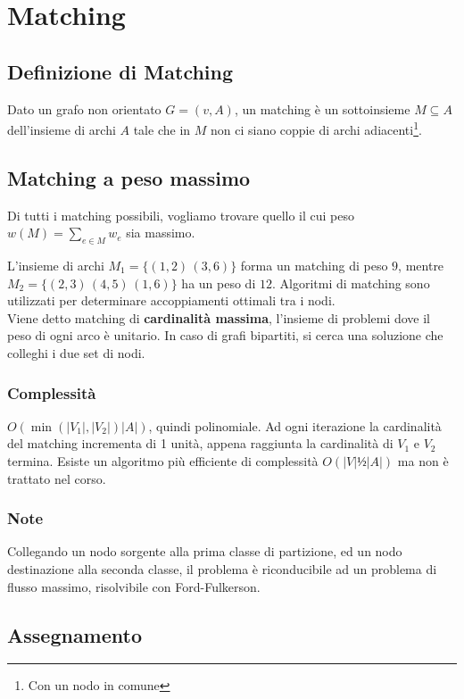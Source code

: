 \documentclass[../template]{subfiles}
\begin{document}
\section{Matching}
\subsection{Definizione di Matching}
Dato un grafo non orientato $G = (v, A)$, un matching è un sottoinsieme $M \subseteq A$ dell'insieme di archi $A$ tale che
in $M$ non ci siano coppie di archi adiacenti\footnote{Con un nodo in comune}.
\subsection{Matching a peso massimo}
Di tutti i matching possibili, vogliamo trovare quello il cui peso $w(M) = \sum_{e \in M} w_e$ sia massimo.

\begin{figure}[h]
    \centering
\end{figure}

\noindent L'insieme di archi $M_1 = \{ (1, 2) \, (3, 6)\}$ forma un matching di peso $9$, mentre $M_2 = \{(2, 3)\,(4, 5)\,(1, 6)\}$ ha un peso
di $12$.
Algoritmi di matching sono utilizzati per determinare accoppiamenti ottimali tra i nodi.
\\[10pt]
Viene detto matching di \textbf{cardinalità massima}, l'insieme di problemi dove il peso di ogni arco è unitario.
In caso di grafi bipartiti, si cerca una soluzione che colleghi i due set di nodi.


%
\subsubsection{Complessità}
$O(\min(|V_1|, |V_2|) |A|)$, quindi polinomiale. Ad ogni iterazione la cardinalità del matching incrementa di 1 unità, appena raggiunta la cardinalità
di $V_1$ e $V_2$ termina. Esiste un algoritmo più efficiente di complessità $O(|V|½|A|)$ ma non è trattato nel corso.

\subsubsection{Note}
Collegando un nodo sorgente alla prima classe di partizione, ed un nodo destinazione alla seconda classe, il problema è riconducibile ad un
problema di flusso massimo, risolvibile con Ford-Fulkerson.

\subsection{Assegnamento}
\end{document}
